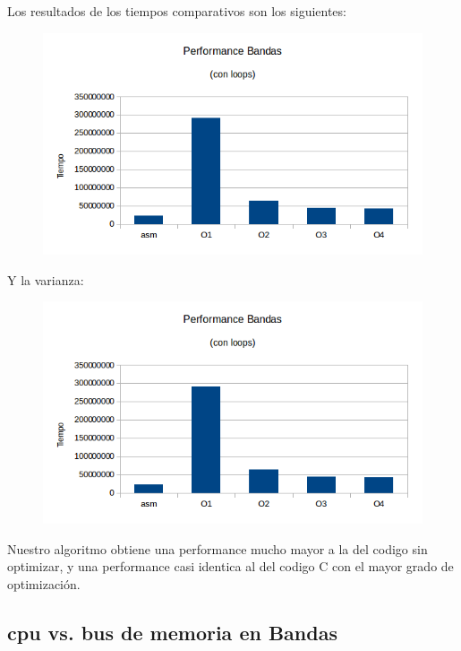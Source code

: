 \documentclass[a4paper]{article}
\begin{document}
Los resultados de los tiempos comparativos son los siguientes:

\begin{figure}[h!]
  \begin{center}
  \includegraphics[scale=0.66]{Graficos1.4/ban/PSO.png}
  \label{nombreparareferenciar9}
  \end{center}
\end{figure}

\newpage
Y la varianza:

\begin{figure}[h!]
  \begin{center}
  \includegraphics[scale=0.66]{Graficos1.4/ban/PSO.png}
  \label{nombreparareferenciar10}
  \end{center}
\end{figure}

Nuestro algoritmo obtiene una performance mucho mayor a la del codigo sin optimizar, y una performance casi identica al del codigo C con el mayor grado de optimización.

\newpage
\subsection{cpu vs. bus de memoria en Bandas}
\end{document}
